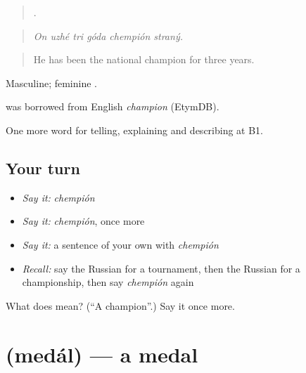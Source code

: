 \begin{quote}
     .
\end{quote}

\begin{quote}
\emph{On uzhé tri góda chempión straný.}
\end{quote}

\begin{quote}
He has been the national champion for three years.
\end{quote}

Masculine; feminine .

\begin{cousinweb}
\emph{} was borrowed from English \emph{champion} (EtymDB).
\end{cousinweb}

\begin{grammarlens}[title={What you've built}]
One more word for telling, explaining and describing at B1.
\end{grammarlens}

\subsection*{Your turn}
\begin{itemize}
\raggedright
  \item \emph{Say it:} \emph{chempión}
  \item \emph{Say it:} \emph{chempión}, once more
  \item \emph{Say it:} a sentence of your own with \emph{chempión}
  \item \emph{Recall:} say the Russian for a tournament, then the Russian for a championship, then say \emph{chempión} again
\end{itemize}

\begin{tcolorbox}[breakable,colback=teal!4,colframe=teal!35!black,title={Before you move on}]
What does  mean? (\textquotedblleft{}A champion\textquotedblright{}.) Say it once more.
\end{tcolorbox}
\section[\texorpdfstring{\ru{медаль} (medál)}{медаль (medál)}]{ (medál) — a medal}

\label{lesson:RU-C511-medal}



